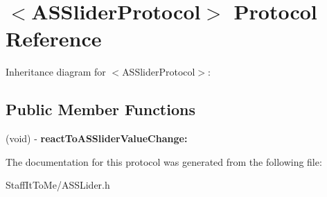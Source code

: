 \hypertarget{protocol_a_s_slider_protocol-p}{
\section{$<$\-A\-S\-Slider\-Protocol$>$ \-Protocol \-Reference}
\label{protocol_a_s_slider_protocol-p}
}


\-Inheritance diagram for $<$\-A\-S\-Slider\-Protocol$>$\-:
\subsection*{\-Public \-Member \-Functions}
\begin{DoxyCompactItemize}
\item 
\hypertarget{protocol_a_s_slider_protocol-p_a9ca056e34170b3822f0ac33e12a27a20}{
(void) -\/ {\bfseries react\-To\-A\-S\-Slider\-Value\-Change\-:}}
\label{protocol_a_s_slider_protocol-p_a9ca056e34170b3822f0ac33e12a27a20}

\end{DoxyCompactItemize}


\-The documentation for this protocol was generated from the following file\-:\begin{DoxyCompactItemize}
\item 
\-Staff\-It\-To\-Me/\-A\-S\-S\-Lider.\-h\end{DoxyCompactItemize}
